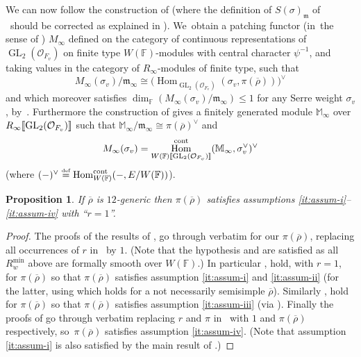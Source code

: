 \documentclass[JEP,XML,SOM,Unicode,NoFloatCountersInSection, NoEqCountersInSection,published]{cedram}
\newcommand{\defeq}{\stackrel{\textrm{\tiny{\upshape{def}}}}{=}}
\newcommand{\F}{\mathbb{F}}
\newcommand{\cO}{\mathcal{O}}
\newcommand{\fm}{\mathfrak{m}}\let\m\fm
\newcommand{\rhobar}{\overline{\rho}}
\newcommand{\brho}{\overline{\rho}}
\newcommand{\bbra}[1]{[\mkern-3mu[#1]\mkern-3mu]}
\DeclareMathOperator{\GL}{GL}
\DeclareMathOperator{\Hom}{Hom}
\theoremstyle{plain}
\newtheorem{prop}{Proposition}[subsection]
\theoremstyle{definition}
\begin{document}
We can now follow the construction of \cite[\S 6.4]{EGS}
(where the definition of $S(\sigma)_{\fm}$ of \loccit~should be corrected as explained in \cite[Rem.\,8.1.3(iii)]{BHHMS1}). We~obtain a patching functor (in~the sense of \cite[\S 6.1]{EGS}) $M_\infty$ defined on the category of continuous representations of $\GL_2(\cO_{F_v})$ on finite type $W(\F)$-modules with central character ${\psi}^{-1}$, and taking values in the category of $R_\infty$-modules of finite type, such that
\[
M_\infty(\sigma_v)/\mathfrak{m}_\infty\cong \bigl(\Hom_{\GL_2(\cO_{F_v})}(\sigma_v,\pi(\rhobar))\bigr)^\vee
\]
and which moreover satisfies $\dim_{\F} (M_\infty(\sigma_v)/\mathfrak{m}_\infty)\leq 1$ for any Serre weight $\sigma_v$, by~\cite[\S 6.5]{EGS}.
Furthermore the construction of \cite[Th.\,6.2]{DoLe} gives a finitely generated module $\mathbb{M}_\infty$ over $R_\infty\bbra{\GL_2(\cO_{F_v})}$ such that $\mathbb{M}_\infty/\fm_\infty\cong \pi(\rhobar)^\vee$ and
\[
M_\infty(\sigma_v)=\Hom^{\textnormal{cont}}_{W(\F)\bbra{\GL_2(\cO_{F_v})}}(\mathbb{M}_\infty,\sigma_v^\vee)^\vee
\]
(where $(-)^\vee\defeq \Hom^{\textnormal{cont}}_{W(\F)}(-,E/W(\F))$).

\begin{prop}
\label{prop:exist:r=1}
If $\rhobar$ is $12$-generic then $\pi(\rhobar)$ satisfies assumptions \eqref{it:assum-i}--\eqref{it:assum-iv} with ``$r=1$''.
\end{prop}

\begin{proof}
The proofs of the results of \cite[\S 8.2, \S 8.3, Th.\,8.4.1, 8.4.2, 8.4.3]{BHHMS1}, \cite[\S 6]{YitongWangGKD} go through {verbatim} {for our $\pi(\brho)$}, replacing all occurrences of $r$ in \loccit~by $1$.
(Note that the hypothesis \cite[\S 8.1, item~(iii)(b)]{BHHMS1} and \cite[\S 1, item (ii)]{YitongWangGKD} are satisfied as all $R_w^{\min}$ above are formally smooth over $W(\F)$.)
In particular \cite[Th.\,1.9]{BHHMS1}, \cite[Th.\,6.3(ii)]{YitongWangGKD} hold, with $r=1$, for $\pi(\rhobar)$ so that $\pi(\rhobar)$ satisfies assumption \eqref{it:assum-i} and \eqref{it:assum-ii} (for the latter, using \cite[Prop.\,6.4.6]{BHHMS1} which holds for a not necessarily semisimple $\rhobar$).
Similarly \cite[Th.\,1.10]{BHHMS1}, \cite[Th.\,6.3(i)]{YitongWangGKD} hold for $\pi(\rhobar)$ so that $\pi(\rhobar)$ satisfies assumption \eqref{it:assum-iii} (via \cite[Th.\,8.2]{HuWang2}).
Finally the proofs of \cite[Lem.\,2.6.2, Prop.~2.6.3]{BHHMS4} go through verbatim replacing $r$ and $\pi$ in \loccit~with $1$ and $\pi(\rhobar)$ respectively, so~$\pi(\rhobar)$ satisfies assumption \eqref{it:assum-iv}.
(Note that assumption \eqref{it:assum-i} is also satisfied by the main result of \cite{LMS, HuWang, DanWild}.)
\end{proof}
\end{document}
